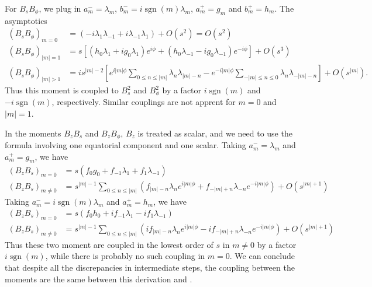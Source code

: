 \documentclass[a4paper, 11pt]{article}
\DeclareMathOperator{\sgn}{sgn}
\begin{document}
For $B_s B_\phi$, we plug in $a_m^- = \lambda_m$, $b_m^- = i\sgn(m) \lambda_m$, $a_m^+ = g_m$ and $b_m^+ = h_m$. The asymptotics
\begin{equation}
    \begin{aligned}
        \left(B_s B_\phi\right)_{m=0} &= (-i\lambda_1 \lambda_{-1} + i\lambda_{-1} \lambda_1) + O\left(s^2\right) = O\left(s^2\right) \\ 
        \left(B_s B_\phi\right)_{|m|=1} &= s \left[\left(h_0 \lambda_1 + i g_0 \lambda_1\right) e^{i\phi} + \left(h_0 \lambda_{-1} - i g_0 \lambda_{-1}\right) e^{-i\phi}\right] + O\left(s^3\right) \\ 
        \left(B_s B_\phi\right)_{|m|>1} &= i s^{|m|-2} \left[e^{i|m|\phi} \sum_{0\leq n \leq |m|} \lambda_n \lambda_{|m|-n} - e^{-i|m|\phi} \sum_{-|m|\leq n\leq 0} \lambda_n \lambda_{-|m|-n}\right] + O\left(s^{|m|}\right).
    \end{aligned}
\end{equation}
Thus this moment is coupled to $B_s^2$ and $B_\phi^2$ by a factor $i\sgn(m)$ and $-i\sgn(m)$, respectively. Similar couplings are not apprent for $m=0$ and $|m|=1$.

In the moments $B_z B_s$ and $B_z B_\phi$, $B_z$ is treated as scalar, and we need to use the formula involving one equatorial component and one scalar. Taking $a_{m}^- = \lambda_m$ and $a_m^+ = g_m$, we have 
\begin{equation}
\begin{aligned}
    \left(B_z B_s\right)_{m=0} &= s \left(f_0 g_0 + f_{-1} \lambda_1 + f_1 \lambda_{-1}\right) \\ 
    \left(B_z B_s\right)_{m\neq 0} &= s^{|m|-1} \sum_{0\leq n\leq |m|}\left(f_{|m|-n} \lambda_n e^{i|m|\phi} + f_{-|m|+n} \lambda_{-n} e^{-i|m|\phi}\right) + O\left(s^{|m|+1}\right)
\end{aligned}
\end{equation}
Taking $a_m^- = i\sgn(m)\lambda_m$ and $a_m^+ = h_m$, we have
\begin{equation}
    \begin{aligned}
        \left(B_z B_s\right)_{m=0} &= s \left(f_0 h_0 + i f_{-1} \lambda_1 - i f_1 \lambda_{-1}\right) \\ 
        \left(B_z B_s\right)_{m\neq 0} &= s^{|m|-1} \sum_{0\leq n\leq |m|}\left(i f_{|m|-n} \lambda_n e^{i|m|\phi} - i f_{-|m|+n} \lambda_{-n} e^{-i|m|\phi}\right) + O\left(s^{|m|+1}\right)
    \end{aligned}
\end{equation}
Thus these two moment are coupled in the lowest order of $s$ in $m\neq 0$ by a factor $i\sgn(m)$, while there is probably no such coupling in $m=0$. We can conclude that despite all the discrepancies in intermediate steps, the coupling between the moments are the same between this derivation and \textcite{holdenried-chernoff_long_2021}.
\end{document}
